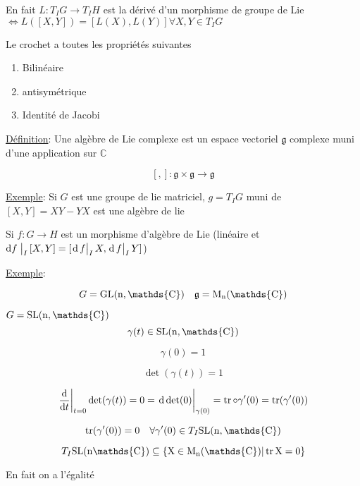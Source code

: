En fait \(L : T_I G \to T_I H\) est la dérivé d'un morphisme de groupe de Lie \(\iff L( [X, Y]  ) = [ L(X), L(Y) ] \forall X, Y \in T_I G \)

Le crochet a toutes les propriétés suivantes 

\begin{enumerate}
	\item Bilinéaire 
	\item antisymétrique
	\item Identité de Jacobi 
\end{enumerate}



\underline{Définition}: Une algèbre de Lie complexe est un espace vectoriel \(\mathfrak{g}\) complexe muni d'une application sur \(\mathds{C} \) 

\[ [{}, {}] : \mathfrak{g} \times  \mathfrak{g} \to \mathfrak{g}  \]

\underline{Exemple}: Si \(G\) est une groupe de lie matriciel, \(g = T_I G\) muni de \( [X, Y] = XY - YX \) est une algèbre de lie


Si \(f: G \to H\) est un morphisme d'algèbre de Lie (linéaire et \( \dd  f \eval{}_{I} [X, Y] = [	\eval{\dd{}f}_{I}X ,\eval{\dd{}f}_{I} Y]    \))


\underline{Exemple}:  

\[ G = \rm{GL}(n, \mathds{C}) \quad \mathfrak{g} = M_n(\mathds{C})\]

\(G = \rm{SL}(n, \mathds{C})\)
\[ \gamma(t) \in \rm{SL}(n ,\mathds{C}) \]

\[ \gamma(0) =1\]

\[ \det(\gamma(t)) = 1 \]

\[ \eval{\dv{{}}{t} }_{t=0} \det (\gamma(t)) = 0 = \eval{\dd \det(0)}_{\gamma (0)} = \tr \circ \gamma '(0) = \tr(\gamma '(0))\]

\[ \tr(\gamma'(0)) = 0 \quad \forall \gamma'(0) \in T_I \rm{SL}(n, \mathds{C}) \]


\[ T_I \rm{SL}(n \mathds{C}) \subseteq \{ X \in M_n (\mathds{C}) | \tr X = 0 \}  \]


En fait on a l'égalité



